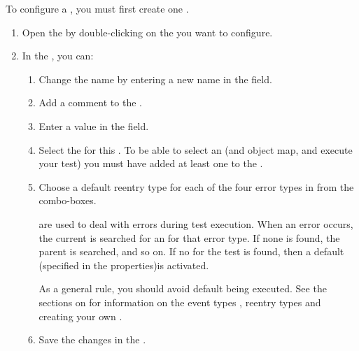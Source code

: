 \label{confsuite}

To configure a \gdsuite{}, you must first create one .


\begin{enumerate}
\item Open the \gdtestsuiteeditor{} by double-clicking on the \gdsuite{} you want to configure. 
\item In the \gdpropview{}, you can:
\begin{enumerate}
\item Change the \gdsuite{} name by entering a new name in the  field.  
\item Add a comment to the \gdsuite{} . 
\item Enter a value in the  field. 


\item Select the \gdaut{} for this \gdsuite{}. To be able to select an \gdaut{} (and object map, and execute your test) you must have added at least one \gdaut{} to the \gdproject{} .




\item Choose a default reentry type for each of the four error types in \app{} from the combo-boxes. 

\gdehandlers{} are \gdcases{} used to deal with errors during test execution. When an error occurs, the current \gdcase{} is searched for an \gdehandler{} for that error type. If none is found, the parent \gdcase{} is searched, and so on. If no \gdehandler{} for the test is found, then a default \gdehandler{} (specified in the \gdsuite{} properties)is activated.  

As a general rule, you should avoid default \gdehandlers{} being executed.
See the sections on \gdehandlers{} for information on the event types , reentry types  and creating your own \gdehandlers{}.
\item Save the changes in the \gdtestsuiteeditor{}.
\end{enumerate}
\end{enumerate}
